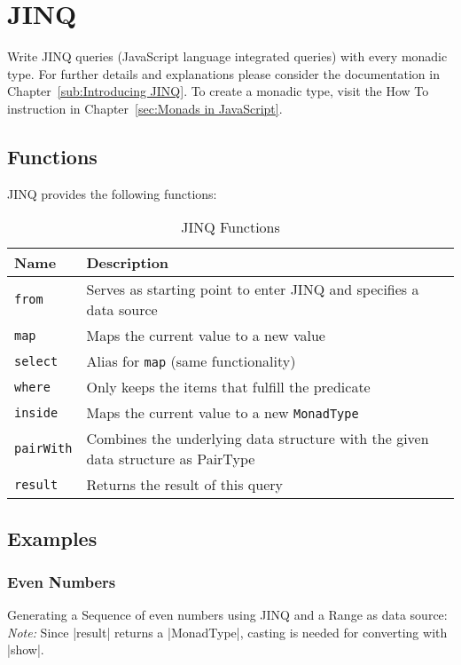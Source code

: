 \section{JINQ} %
\label{sec:API_JINQ}
Write JINQ queries (JavaScript language integrated queries) with every monadic type.
\newline
For further details and explanations please consider the documentation in
Chapter~\ref{sub:Introducing JINQ}.
\newline
To create a monadic type, visit the How To instruction in
Chapter~\ref{sec:Monads in JavaScript}.%


\subsection{Functions}
JINQ provides the following functions:

\begin{table}[H]
  \centering
  \begin{tabularx}{\textwidth}{| l | X |} \hline
    \textbf{Name}       & \textbf{Description} \\ \hline
    \texttt{from}       & Serves as starting point to enter JINQ and specifies a data source \\ \hline 
    \texttt{map}        & Maps the current value to a new value \\ \hline 
    \texttt{select}     & Alias for \texttt{map} (same functionality) \\ \hline 
    \texttt{where}      & Only keeps the items that fulfill the predicate \\ \hline 
    \texttt{inside}     & Maps the current value to a new \texttt{MonadType} \\ \hline 
    \texttt{pairWith}   & Combines the underlying data structure with the given data structure as  PairType \\ \hline 
    \texttt{result}     & Returns the result of this query\\ \hline 

  \end{tabularx}
  \caption{JINQ Functions}
  \label{tab:jinq_functions}
\end{table}

\subsection{Examples}

\subsubsection{Even Numbers}
Generating a Sequence of even numbers using JINQ and a Range as data source:
\newline
\textit{Note:} Since |result| returns a |MonadType|, casting is needed
for converting with |show|.

